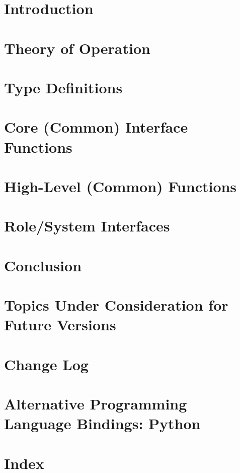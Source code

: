 \documentclass[12pt]{report}
\begin{document}
	\tableofcontents

	\chapter{Introduction}						%
	

	\chapter{Theory of Operation}\label{chap:Theory}
	

	\chapter{Type Definitions}\label{chap:TypeDefinitions}
	

	\chapter{Core (Common) Interface Functions}\label{chap:Common}
	
      
	\chapter{High-Level (Common) Functions}\label{chap:HighLevel}
	

	\chapter{Role/System Interfaces}\label{chap:Interfaces}
	

	\chapter{Conclusion}
	

	\nocite{*}

	\clearpage
	\providecommand*{\phantomsection}{}
	\phantomsection
	
	

	\begin{appendices}

		\chapter{Topics Under Consideration for Future Versions}
		

		\chapter{Change Log}
		

		\chapter{Alternative Programming Language Bindings: Python}
		

	\end{appendices}

	\clearpage
	\chapter{Index}
	{\scriptsize
	\printindex}
\end{document}
